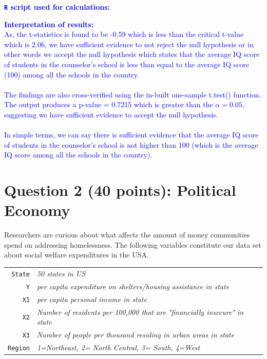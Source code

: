 \documentclass[12pt,letterpaper]{article}
\begin{document}
\begin{enumerate}
\pagebreak
\textcolor{blue}{
	\textbf{\texttt{R} script used for calculations:}
}



\textcolor{blue}{
	\textbf{Interpretation of results:}\\
As, the t-statistics is found to be -0.59 which is less than the critical t-value which is 2.06, we have sufficient evidence to not reject the null hypothesis or in other words we accept the null hypothesis which states that the average IQ score of students in the counselor's school is less than equal to the average IQ score (100) among all the schools in the country.\\
\\
The findings are also cross-verified using the in-built one-sample t.test() function. The output produces a p-value = 0.7215 which is greater than the $\alpha=0.05$, suggesting we have sufficient evidence to accept the null hypothesis.\\
\\
In simple terms, we can say there is sufficient evidence that the average IQ score of students in the counselor's school is not higher than 100 (which is the average IQ score among all the schools in the country).
}

\end{enumerate}

\newpage

	\section*{Question 2 (40 points): Political Economy}

\noindent Researchers are curious about what affects the amount of money communities spend on addressing homelessness. The following variables constitute our data set about social welfare expenditures in the USA. \\
\vspace{.25cm}


\begin{tabular}{r|l}
	\texttt{State} &\emph{50 states in US} \\
	\texttt{Y} & \emph{per capita expenditure on shelters/housing assistance in state}\\
	\texttt{X1} &\emph{per capita personal income in state} \\
	\texttt{X2} &  \emph{Number of residents per 100,000 that are "financially insecure" in state}\\
	\texttt{X3} &  \emph{Number of people per thousand residing in urban areas in state} \\
	\texttt{Region} &  \emph{1=Northeast, 2= North Central, 3= South, 4=West} \\
\end{tabular}
\end{document}
